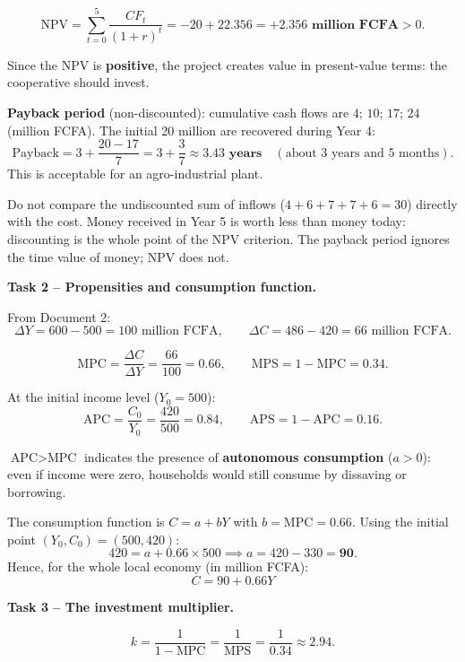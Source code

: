 \documentclass[11pt]{article}
\begin{document}
\[
\text{NPV} = \sum_{t=0}^{5} \frac{CF_t}{(1+r)^t} = -20 + 22.356 = \mathbf{+2.356 \text{ million FCFA}} > 0.
\]

Since the NPV is \textbf{positive}, the project creates value in present-value terms: the cooperative should invest.

\textbf{Payback period} (non-discounted): cumulative cash flows are $4$; $10$; $17$; $24$ (million FCFA). The initial 20 million are recovered during Year 4:
\[
\text{Payback} = 3 + \frac{20 - 17}{7} = 3 + \frac{3}{7} \approx \mathbf{3.43 \text{ years}} \quad (\text{about 3 years and 5 months}).
\]
This is acceptable for an agro-industrial plant.

\begin{attention}
Do not compare the undiscounted sum of inflows ($4+6+7+7+6 = 30$) directly with the cost. Money received in Year 5 is worth less than money today: discounting is the whole point of the NPV criterion. The payback period ignores the time value of money; NPV does not.
\end{attention}

\textbf{Task 2 -- Propensities and consumption function.}

From Document 2:
\[
\Delta Y = 600 - 500 = 100 \text{ million FCFA}, \qquad
\Delta C = 486 - 420 = 66 \text{ million FCFA}.
\]

\[
\text{MPC} = \frac{\Delta C}{\Delta Y} = \frac{66}{100} = \mathbf{0.66}, \qquad
\text{MPS} = 1 - \text{MPC} = \mathbf{0.34}.
\]

At the initial income level ($Y_0 = 500$):
\[
\text{APC} = \frac{C_0}{Y_0} = \frac{420}{500} = \mathbf{0.84}, \qquad
\text{APS} = 1 - \text{APC} = \mathbf{0.16}.
\]

\begin{aretenir}[Interpretation]
$\text{APC} > \text{MPC}$ indicates the presence of \textbf{autonomous consumption} ($a > 0$): even if income were zero, households would still consume by dissaving or borrowing.
\end{aretenir}

The consumption function is $C = a + bY$ with $b = \text{MPC} = 0.66$. Using the initial point $(Y_0, C_0) = (500, 420)$:
\[
420 = a + 0.66 \times 500 \implies a = 420 - 330 = \mathbf{90}.
\]
Hence, for the whole local economy (in million FCFA):
\[
\boxed{C = 90 + 0.66Y}
\]

\textbf{Task 3 -- The investment multiplier.}

\[
k = \frac{1}{1 - \text{MPC}} = \frac{1}{\text{MPS}} = \frac{1}{0.34} \approx \mathbf{2.94}.
\]
\end{document}
